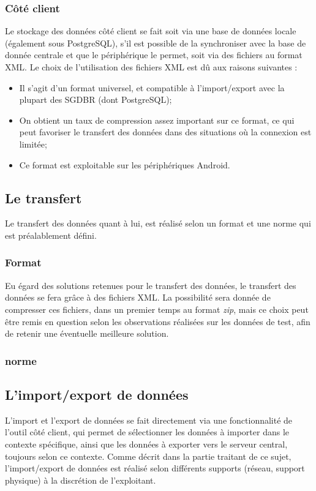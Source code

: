 \subsubsection{Côté client}
Le stockage des données côté client se fait soit via une base de données locale (également sous PostgreSQL), s'il est possible de la synchroniser avec la base de donnée centrale et que le périphérique le permet, soit via des fichiers au format XML.
Le choix de l'utilisation des fichiers XML est dû aux raisons suivantes :
\begin{itemize}
	\item Il s'agit d'un format universel, et compatible à l'import/export avec la plupart des SGDBR (dont PostgreSQL);
	\item On obtient un taux de compression assez important sur ce format, ce qui peut favoriser le transfert des données dans des situations où la connexion est limitée;
	\item Ce format est exploitable sur les périphériques Android.
\end{itemize}

\subsection{Le transfert}
Le transfert des données quant à lui, est réalisé selon un format et une norme qui est préalablement défini.

\subsubsection{Format}
Eu égard des solutions retenues pour le transfert des données, le transfert des données se fera grâce à des fichiers XML.
La possibilité sera donnée de compresser ces fichiers, dans un premier temps au format \textit{zip}, mais ce choix peut être remis en question selon les observations réalisées sur les données de test, afin de retenir une éventuelle meilleure solution.

\subsubsection{norme}
% 
% 

\subsection{L'import/export de données}

L'import et l'export de données se fait directement via une fonctionnalité de l'outil côté client, qui permet de sélectionner les données à importer dans le contexte spécifique, ainsi que les données à exporter vers le serveur central, toujours selon ce contexte.
Comme décrit dans la partie traitant de ce sujet, l'import/export de données est réalisé selon différents supports (réseau, support physique) à la discrétion de l'exploitant.


	

